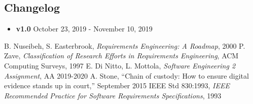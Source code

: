 \begin{appendices}
	\section{Changelog}
	\begin{itemize}
		\item \textbf{v1.0} October 23, 2019 - November 10, 2019
	
	\end{itemize}
\end{appendices}

\clearpage

\begin{thebibliography}{9}

B. Nuseibeh, S. Easterbrook, \emph{Requirements Engineering: A Roadmap}, 2000
P. Zave, \emph{Classification of Research Efforts in Requirements
Engineering}, ACM Computing Surveys, 1997
 E. Di Nitto, L. Mottola, \emph{Software Engineering 2 Assignment}, AA 2019-2020
 A. Stone, “Chain of custody: How to ensure digital evidence stands up in court,” September 2015
IEEE Std 830:1993, \emph{IEEE Recommended Practice for Software Requirements Specifications}, 1993

\end{thebibliography}
